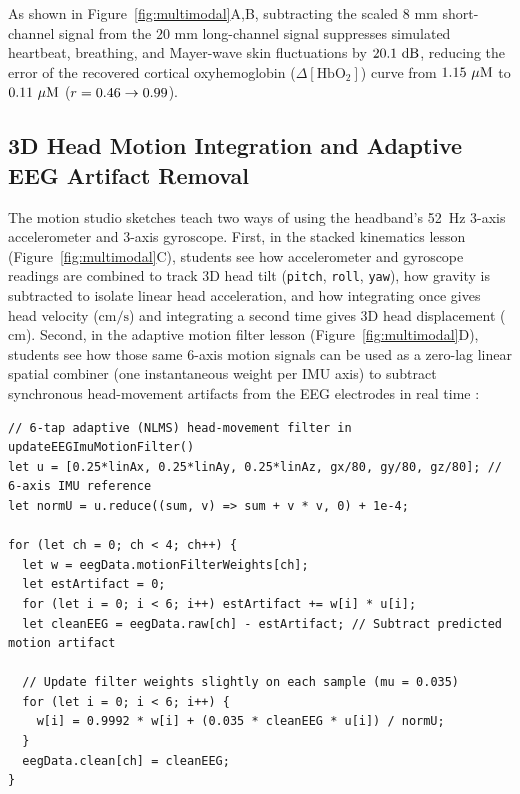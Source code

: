 \documentclass[11pt]{article}
\begin{document}
As shown in Figure~\ref{fig:multimodal}A,B, subtracting the scaled $8\text{ mm}$ short-channel signal from the $20\text{ mm}$ long-channel signal suppresses simulated heartbeat, breathing, and Mayer-wave skin fluctuations by $20.1\text{ dB}$, reducing the error of the recovered cortical oxyhemoglobin ($\Delta[\text{HbO}_2]$) curve from $\FNIRSErrRawUM\ \mu\text{M}$ to $\FNIRSErrCleanUM\ \mu\text{M}$ ($r = 0.46 \rightarrow 0.99$).

\subsection{3D Head Motion Integration and Adaptive EEG Artifact Removal}
The motion studio sketches teach two ways of using the headband's 52~Hz 3-axis accelerometer and 3-axis gyroscope. First, in the stacked kinematics lesson (Figure~\ref{fig:multimodal}C), students see how accelerometer and gyroscope readings are combined to track 3D head tilt (\texttt{pitch}, \texttt{roll}, \texttt{yaw}), how gravity is subtracted to isolate linear head acceleration, and how integrating once gives head velocity ($\text{cm/s}$) and integrating a second time gives 3D head displacement ($\text{cm}$). Second, in the adaptive motion filter lesson (Figure~\ref{fig:multimodal}D), students see how those same 6-axis motion signals can be used as a zero-lag linear spatial combiner (one instantaneous weight per IMU axis) to subtract synchronous head-movement artifacts from the EEG electrodes in real time \citep{widrow1975adaptive,mathewson2024moving}:

\noindent\begin{minipage}{\textwidth}
\begin{lstlisting}
// 6-tap adaptive (NLMS) head-movement filter in updateEEGImuMotionFilter()
let u = [0.25*linAx, 0.25*linAy, 0.25*linAz, gx/80, gy/80, gz/80]; // 6-axis IMU reference
let normU = u.reduce((sum, v) => sum + v * v, 0) + 1e-4;

for (let ch = 0; ch < 4; ch++) {
  let w = eegData.motionFilterWeights[ch];
  let estArtifact = 0;
  for (let i = 0; i < 6; i++) estArtifact += w[i] * u[i];
  let cleanEEG = eegData.raw[ch] - estArtifact; // Subtract predicted motion artifact

  // Update filter weights slightly on each sample (mu = 0.035)
  for (let i = 0; i < 6; i++) {
    w[i] = 0.9992 * w[i] + (0.035 * cleanEEG * u[i]) / normU;
  }
  eegData.clean[ch] = cleanEEG;
}
\end{lstlisting}
\end{minipage}
\vspace{4pt}
\end{document}
